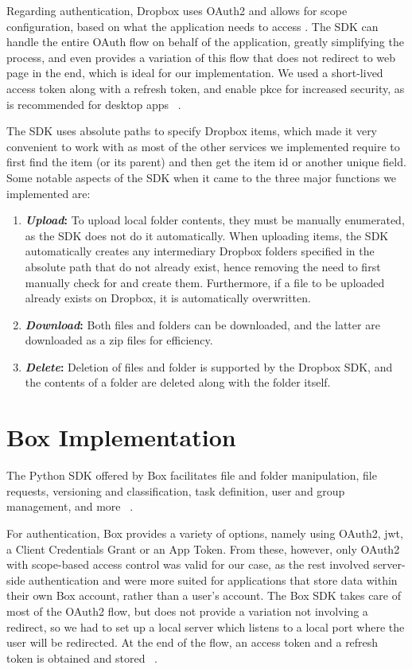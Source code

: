 Regarding authentication, Dropbox uses OAuth2 and allows for scope configuration, based on what the application needs to access . The SDK can handle the entire OAuth flow on behalf of the application, greatly simplifying the process, and even provides a variation of this flow that does not redirect to web page in the end, which is ideal for our implementation.  We used a short-lived access token along with a refresh token, and enable \ac{pkce} for increased security, as is recommended for desktop apps ~\cite{dropbox_oauth}.

The SDK uses absolute paths to specify Dropbox items, which made it very convenient to work with as most of the other services we implemented require to first find the item (or its parent) and then get the item id or another unique field. Some notable aspects of the SDK when it came to the three major functions we implemented are: ~\cite{dropbox_docs}

\begin{enumerate}
	\item \textbf{\textit{Upload}:} To upload local folder contents, they must be manually enumerated, as the SDK does not do it automatically. When uploading items, the SDK automatically creates any intermediary Dropbox folders specified in the absolute path that do not already exist, hence removing the need to first manually check for and create them. Furthermore, if a file to be uploaded already exists on Dropbox, it is automatically overwritten.
	
	\item \textbf{\textit{Download}:} Both files and folders can be downloaded, and the latter are downloaded as a zip files for efficiency. 
	
	\item \textbf{\textit{Delete}:} Deletion of files and folder is supported by the Dropbox SDK, and the contents of a folder are deleted along with the folder itself.
\end{enumerate}


\section{Box Implementation}
The Python SDK offered by Box facilitates file and folder manipulation, file requests, versioning and classification, task definition, user and group management, and more ~\cite{box_docs}. 

For authentication, Box provides a variety of options, namely using OAuth2, \ac{jwt}, a Client Credentials Grant or an App Token. From these, however, only OAuth2 with scope-based access control was valid for our case, as the rest involved server-side authentication and were more suited for applications that store data within their own Box account, rather than a user's account.  The Box SDK takes care of most of the OAuth2 flow, but does not provide a variation not involving a redirect, so we had to set up a local server which listens to a local port where the user will be redirected. At the end of the flow, an access token and a refresh token is obtained and stored ~\cite{box_auth}.

